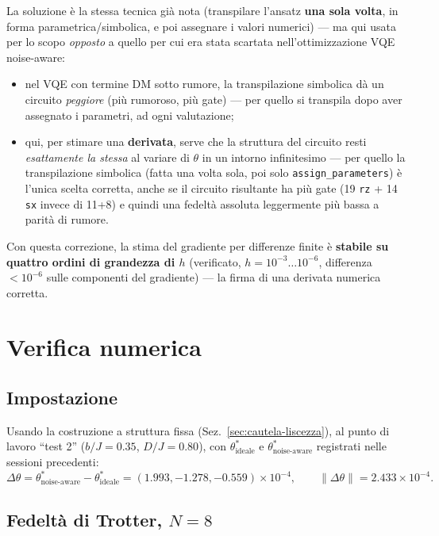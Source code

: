 \documentclass[11pt,a4paper]{article}
\begin{document}
La soluzione è la stessa tecnica già nota (transpilare l'ansatz
\textbf{una sola volta}, in forma parametrica/simbolica, e poi assegnare
i valori numerici) --- ma qui usata per lo scopo \emph{opposto} a quello
per cui era stata scartata nell'ottimizzazione VQE noise-aware:
\begin{itemize}[leftmargin=1.3em,itemsep=0.2em]
\item nel VQE con termine DM sotto rumore, la transpilazione simbolica dà un
circuito \emph{peggiore} (più rumoroso, più gate) --- per quello si
transpila dopo aver assegnato i parametri, ad ogni valutazione;
\item qui, per stimare una \textbf{derivata}, serve che la struttura del
circuito resti \emph{esattamente la stessa} al variare di $\theta$ in un
intorno infinitesimo --- per quello la transpilazione simbolica (fatta
una volta sola, poi solo \texttt{assign\_parameters}) è l'unica scelta
corretta, anche se il circuito risultante ha più gate (19 \texttt{rz} + 14
\texttt{sx} invece di 11+8) e quindi una fedeltà assoluta leggermente più
bassa a parità di rumore.
\end{itemize}
Con questa correzione, la stima del gradiente per differenze finite è
\textbf{stabile su quattro ordini di grandezza di $h$} (verificato,
$h=10^{-3}\ldots10^{-6}$, differenza $<10^{-6}$ sulle componenti del
gradiente) --- la firma di una derivata numerica corretta.

\section{Verifica numerica}

\subsection{Impostazione}

Usando la costruzione a struttura fissa (Sez.~\ref{sec:cautela-liscezza}),
al punto di lavoro ``test 2'' ($b/J=0.35$, $D/J=0.80$), con
$\theta^*_\text{ideale}$ e $\theta^*_\text{noise-aware}$ registrati nelle
sessioni precedenti:
\begin{equation}
\Delta\theta = \theta^*_\text{noise-aware}-\theta^*_\text{ideale} =
(1.993, -1.278, -0.559)\times10^{-4}, \qquad \|\Delta\theta\| =
2.433\times10^{-4}.
\end{equation}

\subsection{Fedeltà di Trotter, $N=8$}
\end{document}
